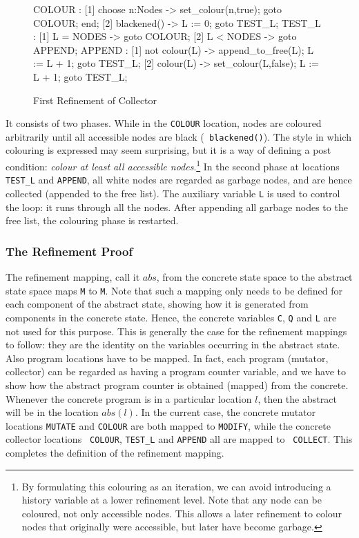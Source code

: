 \begin{figure}[htb]
\begin{smallsession}
  COLOUR :
    [1] choose n:Nodes -> 
          set_colour(n,true); 
          goto COLOUR;
        end;
    [2] blackened() -> L := 0; goto TEST_L;
  TEST_L :
    [1] L = NODES -> goto COLOUR;
    [2] L < NODES -> goto APPEND;
  APPEND :
    [1] not colour(L) -> append_to_free(L); L := L + 1; goto TEST_L;
    [2] colour(L) -> set_colour(L,false); L := L + 1; goto TEST_L; 
\end{smallsession}
\caption{First Refinement of Collector}
\label{refinement1-collector}
\end{figure}

It consists of two phases.  While  in the {\tt COLOUR} location, nodes
are coloured arbitrarily until  all  accessible nodes are black  ({\tt
  blackened()})\@.  The style in which colouring is expressed may seem
surprising, but it is a way of defining a  post condition: {\em colour
  at  least  all   accessible nodes}\@.\footnote{By  formulating  this
  colouring as    an iteration, we   can  avoid introducing  a history
  variable at a lower  refinement level.   Note  that any node can  be
  coloured, not only accessible  nodes. This allows a later refinement
  to colour nodes   that originally were  accessible,  but  later have
  become  garbage.}  In the  second phase at locations {\tt TEST\_L} and
{\tt APPEND},  all white nodes are  regarded as garbage nodes, and are
hence collected (appended to the free list)\@.  The auxiliary variable
{\tt L}  is used to  control the loop: it  runs through all the nodes. 
After  appending all  garbage  nodes to the  free  list, the colouring
phase is restarted.


\subsubsection{The Refinement Proof}
\label{first-informal-refinement}

The  refinement mapping, call it $abs$,  from the concrete state space
to the abstract state space maps {\tt M} to {\tt M}\@.  Note that such
a mapping only needs to be defined  for each component of the abstract
state,  showing how it  is generated  from  components in the concrete
state.  Hence, the concrete variables {\tt C}, {\tt Q} and {\tt L} are
not used  for this  purpose.   This is  generally  the case   for  the
refinement mappings to follow: they are  the identity on the variables
occurring  in the abstract state.  Also  program  locations have to be
mapped.  In fact, each program (mutator, collector) can be regarded as
having a program   counter  variable, and we    have to show  how  the
abstract program   counter is obtained  (mapped)  from  the  concrete. 
Whenever the  concrete program is in a  particular  location $l$, then
the abstract will be in  the location $abs(l)$.   In the current case,
the concrete mutator locations {\tt  MUTATE} and {\tt COLOUR} are both
mapped to  {\tt MODIFY}, while  the  concrete collector locations {\tt
  COLOUR}, {\tt  TEST\_L}  and {\tt APPEND}   all are mapped   to {\tt
  COLLECT}\@. This completes the definition of the refinement mapping.

